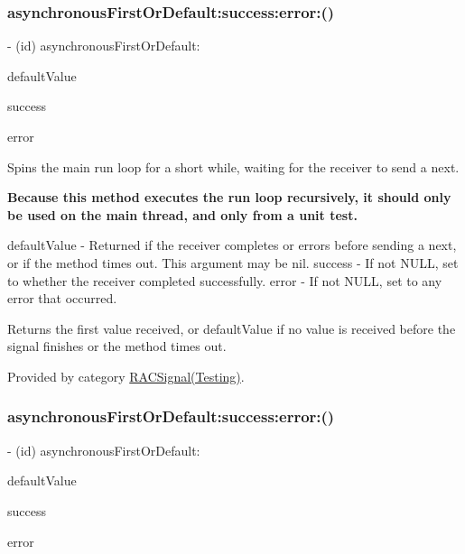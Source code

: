 \subsubsection{\texorpdfstring{asynchronous\+First\+Or\+Default\+:success\+:error\+:()}{asynchronousFirstOrDefault:success:error:()}\hspace{0.1cm}{\footnotesize\ttfamily [1/3]}}
{\footnotesize\ttfamily -\/ (id) asynchronous\+First\+Or\+Default\+: \begin{DoxyParamCaption}\item[{(id)}]{default\+Value }\item[{success:(B\+O\+OL $\ast$)}]{success }\item[{error:(N\+S\+Error $\ast$$\ast$)}]{error }\end{DoxyParamCaption}}

Spins the main run loop for a short while, waiting for the receiver to send a {\ttfamily next}.

{\bfseries Because this method executes the run loop recursively, it should only be used on the main thread, and only from a unit test.}

default\+Value -\/ Returned if the receiver completes or errors before sending a {\ttfamily next}, or if the method times out. This argument may be nil. success -\/ If not N\+U\+LL, set to whether the receiver completed successfully. error -\/ If not N\+U\+LL, set to any error that occurred.

Returns the first value received, or {\ttfamily default\+Value} if no value is received before the signal finishes or the method times out. 

Provided by category \mbox{\hyperlink{category_r_a_c_signal_07_testing_08_a477114852c0e761a023a35e35ccc1784}{R\+A\+C\+Signal(\+Testing)}}.

\mbox{\label{interface_r_a_c_signal_a477114852c0e761a023a35e35ccc1784}} 
\subsubsection{\texorpdfstring{asynchronous\+First\+Or\+Default\+:success\+:error\+:()}{asynchronousFirstOrDefault:success:error:()}\hspace{0.1cm}{\footnotesize\ttfamily [2/3]}}
{\footnotesize\ttfamily -\/ (id) asynchronous\+First\+Or\+Default\+: \begin{DoxyParamCaption}\item[{(id)}]{default\+Value }\item[{success:(B\+O\+OL $\ast$)}]{success }\item[{error:(N\+S\+Error $\ast$$\ast$)}]{error }\end{DoxyParamCaption}}

